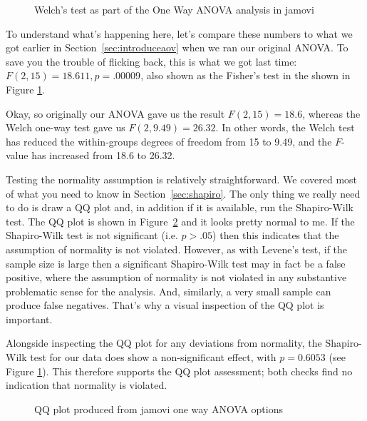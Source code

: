 \begin{figure}[htb]
\begin{center}
\caption{Welch's test as part of the One Way ANOVA analysis in jamovi}
\HR
\label{fig:anova4a}
\end{center}
\end{figure}

\noindent
To understand what's happening here, let's compare these numbers to what we got earlier in Section~\ref{sec:introduceaov} when we ran our original ANOVA. To save you the trouble of flicking back, this is what we got last time: $F(2,15) = 18.611, p=.00009$, also shown as the Fisher's test in the  shown in Figure \ref{fig:anova4a}. 

Okay, so originally our ANOVA gave us the result $F(2,15) = 18.6$, whereas the Welch one-way test gave us $F(2,9.49) = 26.32$. In other words, the Welch test has reduced the within-groups degrees of freedom from 15 to 9.49, and the $F$-value has increased from 18.6 to 26.32. 


Testing the normality assumption is relatively straightforward. We covered most of what you need to know in Section~\ref{sec:shapiro}. The only thing we really need to do is draw a QQ plot and, in addition if it is available, run the Shapiro-Wilk test. The QQ plot is shown in Figure~\ref{fig:anova5} and it looks pretty normal to me. If the Shapiro-Wilk test is not significant (i.e. $p>.05$) then this indicates that the assumption of normality is not violated. However, as with Levene's test, if the sample size is large then a significant  Shapiro-Wilk test may in fact be a false positive, where the assumption of normality is not violated in any substantive problematic sense for the analysis. And, similarly, a very small sample can produce false negatives. That's why a visual inspection of the QQ plot is important. 

Alongside inspecting the QQ plot for any deviations from normality, the Shapiro-Wilk test for our data does show a non-significant effect, with $p=0.6053$ (see Figure \ref{fig:anova4a}). This therefore supports the QQ plot assessment; both checks find no indication that normality is violated.

\begin{figure}[p]
\begin{center}
\caption{QQ plot produced from jamovi one way ANOVA options}
\HR
\label{fig:anova5}
\end{center}
\end{figure}


